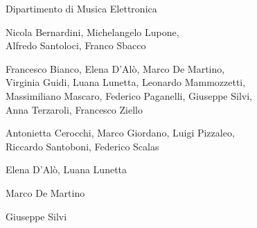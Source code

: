 

%
%
	
{\fontsize{24}{22} }

\medskip

{\fontsize{12}{12} \textsf{Dipartimento di Musica Elettronica}}

\vspace{.5cm}

\textbf{}

Nicola Bernardini, Michelangelo Lupone, \\ Alfredo Santoloci, Franco Sbacco

\medskip

\textbf{}

Francesco Bianco, Elena D’Alò, Marco De Martino, \\ Virginia Guidi, Luana Lunetta, Leonardo Mammozzetti, \\ Massimiliano Mascaro, Federico Paganelli, Giuseppe Silvi, \\ Anna Terzaroli, Francesco Ziello  

\medskip

\textbf{}

Antonietta Cerocchi, Marco Giordano, Luigi Pizzaleo, \\ Riccardo Santoboni, Federico Scalas

\medskip

\textbf{}

Elena D’Alò, Luana Lunetta

\medskip

\textbf{}

Marco De Martino

\medskip

\textbf{}

Giuseppe Silvi

